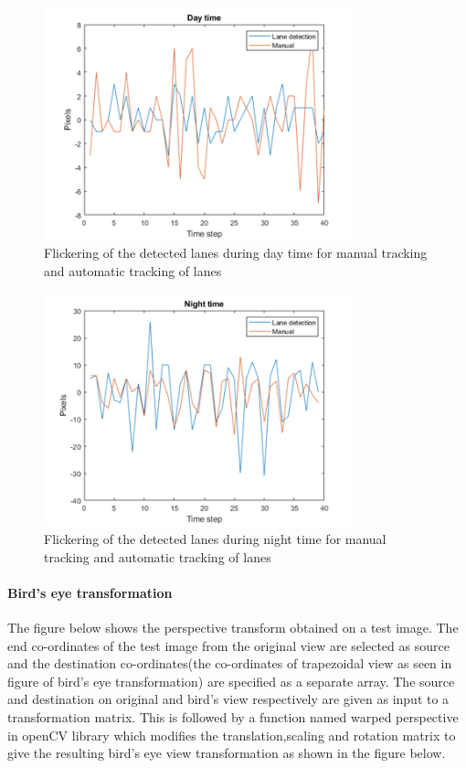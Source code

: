 \begin{figure}[H]
    \centering
    \includegraphics[width = 0.8\textwidth]{Figures/flick2.png}
    \caption{Flickering of the detected lanes during day time for manual tracking and automatic tracking of lanes}
    \label{fig:flick_day}
\end{figure}

\begin{figure}[H]
    \centering
    \includegraphics[width = 0.8\textwidth]{Figures/flick1.png}
    \caption{Flickering of the detected lanes during night time for manual tracking and automatic tracking of lanes}
    \label{fig:flick_night}
\end{figure}




\paragraph{Bird's eye transformation}
The figure below shows the perspective transform obtained on a test image. The end co-ordinates of the test image from the original view are selected as source and the destination co-ordinates(the co-ordinates of trapezoidal view as seen in figure of bird's eye transformation) are specified as a separate array. The source and destination on original and bird's view respectively are given as input to a transformation matrix. This is followed by a function named warped perspective in openCV library which modifies the translation,scaling and rotation matrix to give the resulting bird's eye view transformation as shown in the figure below.

